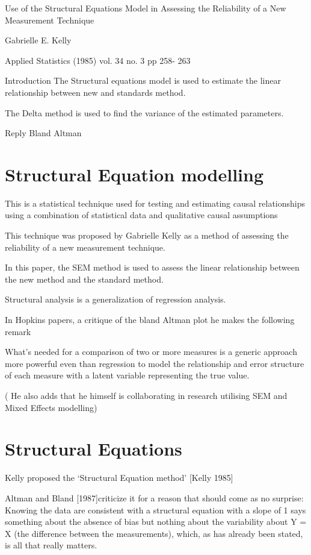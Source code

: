 
Use of the Structural Equations Model in Assessing the Reliability of a New Measurement Technique

Gabrielle E. Kelly

Applied Statistics (1985) vol. 34 no. 3 pp 258- 263

Introduction
The Structural equations model is used to estimate the linear relationship between new and standards method.

The Delta method is used to find the variance of the estimated parameters.

Reply
Bland Altman 


\section{Structural Equation modelling}

This is a statistical technique used for testing and estimating causal relationships using a combination of statistical data and qualitative causal assumptions

This technique was proposed by Gabrielle Kelly as a method of assessing the reliability of a new measurement technique.

In this paper, the SEM method is used to assess the linear relationship between the new method and the standard method.

Structural analysis is a generalization of regression analysis.

In Hopkins papers, a critique of the bland Altman plot he makes the following remark

What's needed for a comparison of two or more measures is a generic approach more powerful even than regression to model the relationship and error structure of each measure with a latent variable representing the true value.  

( He also adds that he himself is collaborating in research utilising SEM and Mixed Effects modelling)
\section{Structural Equations}

Kelly proposed the ‘Structural Equation method’ [Kelly 1985]

Altman and Bland [1987]criticize it for a reason that should come as no surprise: 
Knowing the data are consistent with a structural equation with a slope of 1 says something 
about the absence of bias but nothing about the variability about Y = X (the difference between the measurements), which, as has already been stated, is all that really matters.

